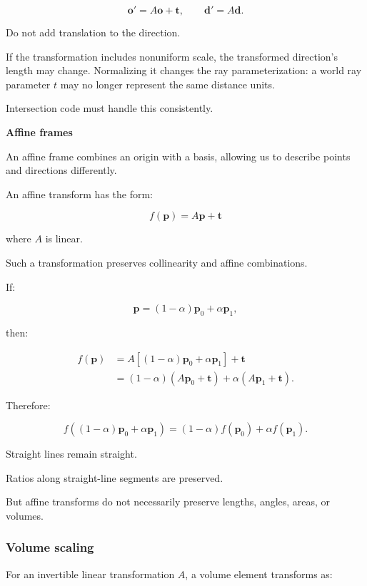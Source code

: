 \[
 \boxed{ \mathbf o'=A\mathbf o+\mathbf t, \qquad \mathbf d'=A\mathbf d }.
\]

Do not add translation to the direction.

If the transformation includes nonuniform scale, the transformed direction's length may change. Normalizing it changes the ray parameterization: a world ray parameter \(t\) may no longer represent the same distance units.

Intersection code must handle this consistently.

\textbf{Affine frames}

An affine frame combines an origin with a basis, allowing us to describe points and directions differently.

An affine transform has the form:

\[
 \boxed{ f(\mathbf p)=A\mathbf p+\mathbf t }
\]

where \(A\) is linear.

Such a transformation preserves collinearity and affine combinations.

If:

\[
 \mathbf p=(1-\alpha)\mathbf p_0+\alpha\mathbf p_1,
\]

then:

\[
 \begin{aligned} f(\mathbf p) &= A[(1-\alpha)\mathbf p_0+\alpha\mathbf p_1]+\mathbf t\\ &=(1-\alpha)(A\mathbf p_0+\mathbf t) +\alpha(A\mathbf p_1+\mathbf t). \end{aligned}
\]

Therefore:

\[
 \boxed{ f((1-\alpha)\mathbf p_0+\alpha\mathbf p_1) = (1-\alpha)f(\mathbf p_0)+\alpha f(\mathbf p_1) }.
\]

Straight lines remain straight.

Ratios along straight-line segments are preserved.

But affine transforms do not necessarily preserve lengths, angles, areas, or volumes.

\subsubsection{Volume scaling}\label{02-foundations-ii-ch032-volume-scaling}

\hypertarget{02-foundations-ii-ch032-volume-scaling}{}

For an invertible linear transformation \(A\), a volume element transforms as:

